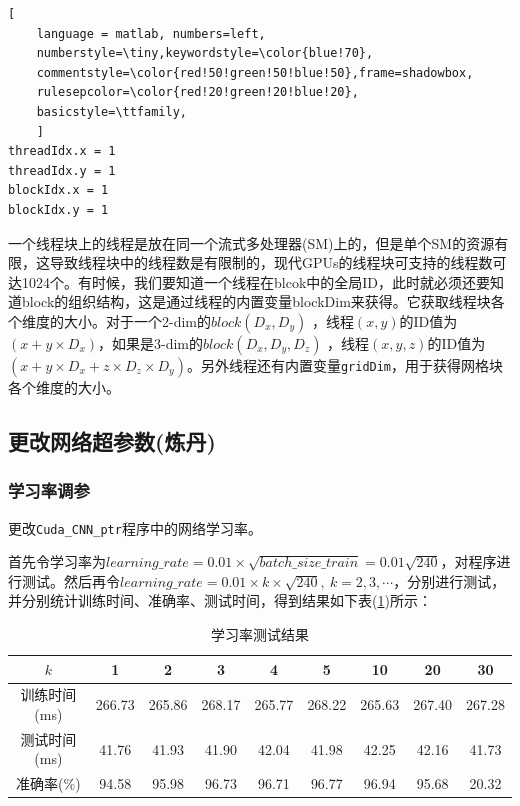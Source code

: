 \documentclass[UTF-8, a4paper, 12pt]{ctexart}
\begin{document}
\begin{lstlisting}[
	language = matlab, numbers=left, 
	numberstyle=\tiny,keywordstyle=\color{blue!70},
	commentstyle=\color{red!50!green!50!blue!50},frame=shadowbox,
	rulesepcolor=\color{red!20!green!20!blue!20},
	basicstyle=\ttfamily,
	]
threadIdx.x = 1
threadIdx.y = 1
blockIdx.x = 1
blockIdx.y = 1
\end{lstlisting}

一个线程块上的线程是放在同一个流式多处理器(SM)上的，但是单个SM的资源有限，这导致线程块中的线程数是有限制的，现代GPUs的线程块可支持的线程数可达1024个。有时候，我们要知道一个线程在blcok中的全局ID，此时就必须还要知道block的组织结构，这是通过线程的内置变量blockDim来获得。它获取线程块各个维度的大小。对于一个2-dim的$block(D_x,D_y)$ ，线程$(x,y)$的ID值为$(x+y\times D_x)$，如果是3-dim的$block(D_x,D_y,D_z)$ ，线程$(x,y,z)$的ID值为$(x+y\times D_x+z\times D_z\times D_y)$。另外线程还有内置变量\colorbox[gray]{0.9}{\texttt{gridDim}}，用于获得网格块各个维度的大小。






\subsection{更改网络超参数(炼丹)}

\subsubsection{学习率调参}

更改\colorbox[gray]{0.9}{\texttt{Cuda\_CNN\_ptr}}程序中的网络学习率。

首先令学习率为$learning\_rate=0.01\times \sqrt{batch\_size\_train}=0.01\sqrt{240}$，对程序进行测试。然后再令$learning\_rate=0.01\times k\times \sqrt{240},\ k=2,3,\cdots$，分别进行测试，并分别统计训练时间、准确率、测试时间，得到结果如下表(\ref{learning_rate})所示：
\begin{table}[htbp]
    \centering
    \caption{学习率测试结果}\label{learning_rate}
    \begin{tabular}{c|cccccccc}
        \hline
        $k$&1&2&3&4&5&10&20&30\\
        \hline 
        训练时间(ms)&266.73&265.86&268.17&265.77&268.22&265.63&267.40&267.28\\
        测试时间(ms)&41.76&41.93&41.90&42.04&41.98&42.25&42.16&41.73\\
        准确率(\%)&94.58& 95.98&96.73&96.71&96.77&96.94&95.68&20.32\\
        \hline  
        
    \end{tabular}
\end{table}
\end{document}
